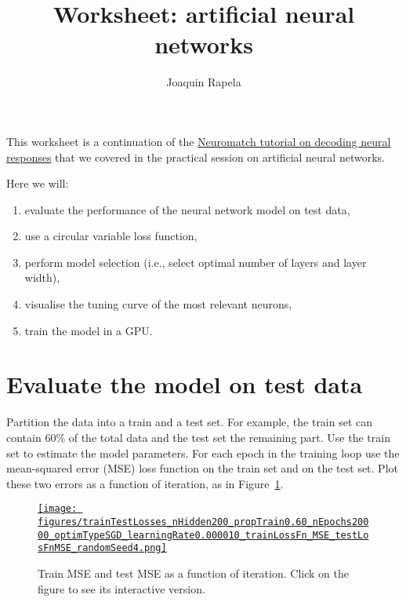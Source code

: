 \documentclass[12pt]{article}
\title{Worksheet: artificial neural networks}
\author{Joaquin Rapela}
\begin{document}
\maketitle

This worksheet is a continuation of the
\href{https://compneuro.neuromatch.io/tutorials/W1D5_DeepLearning/student/W1D5_Tutorial1.html}{Neuromatch
tutorial on decoding neural responses} that we covered in the practical session
on artificial neural networks.

Here we will:

\begin{enumerate}

    \item evaluate the performance of the neural network model on test
        data,

    \item use a circular variable loss function,

    \item perform model selection (i.e., select optimal number of layers and
        layer width),

    \item visualise the tuning curve of the most relevant neurons,

    \item train the model in a GPU.

\end{enumerate}

\section{Evaluate the model on test data}

Partition the data into a train and a test set. For example, the train set can
contain 60\% of the total data and the test set the remaining part. Use the
train set to estimate the model parameters. For each epoch in the training loop
use the mean-squared error (MSE) loss function on the train set and on the test set.
Plot these two errors as a function of iteration, as in
Figure~\ref{fig:trainMSETestMSE}.

\begin{figure}[H]
    \begin{center}
        \href{https://www.gatsby.ucl.ac.uk/~rapela/statNeuro/2025/worksheets/08_artificialNeuralNetworks/figures/trainTestLosses_nHidden200_propTrain0.60_nEpochs20000_optimTypeSGD_learningRate0.000010_trainLossFn_MSE_testLosFnMSE_randomSeed4.html}{\texttt{[image: figures/trainTestLosses\_nHidden200\_propTrain0.60\_nEpochs20000\_optimTypeSGD\_learningRate0.000010\_trainLossFn\_MSE\_testLosFnMSE\_randomSeed4.png]}}

        \caption{Train MSE and test MSE as a function of iteration. Click on
        the figure to see its interactive version.}

        \label{fig:trainMSETestMSE}
    \end{center}
\end{figure}
\end{document}
